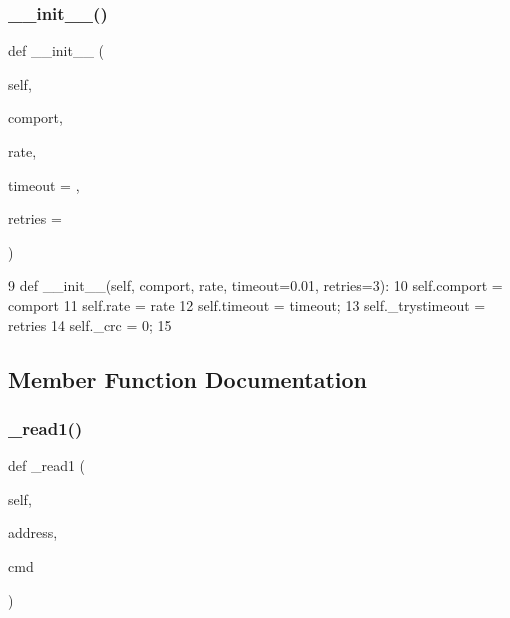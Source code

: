 \subsubsection{\texorpdfstring{\+\_\+\+\_\+init\+\_\+\+\_\+()}{\_\_init\_\_()}}
{\footnotesize\ttfamily def \+\_\+\+\_\+init\+\_\+\+\_\+ (\begin{DoxyParamCaption}\item[{}]{self,  }\item[{}]{comport,  }\item[{}]{rate,  }\item[{}]{timeout = {},  }\item[{}]{retries = {} }\end{DoxyParamCaption})}


\begin{DoxyCode}
9     \textcolor{keyword}{def }\_\_init\_\_(self, comport, rate, timeout=0.01, retries=3):
10         self.comport = comport
11         self.rate = rate
12         self.timeout = timeout;
13         self.\_trystimeout = retries
14         self.\_crc = 0;
15 
\end{DoxyCode}


\subsection{Member Function Documentation}
\mbox{\label{classtoxic__hardware_1_1roboclaw__3_1_1Roboclaw_a37f6c14f4919eada2b0985cd324f523f}} 
\subsubsection{\texorpdfstring{\+\_\+read1()}{\_read1()}}
{\footnotesize\ttfamily def \+\_\+read1 (\begin{DoxyParamCaption}\item[{}]{self,  }\item[{}]{address,  }\item[{}]{cmd }\end{DoxyParamCaption})\hspace{0.3cm}{\ttfamily [private]}}


